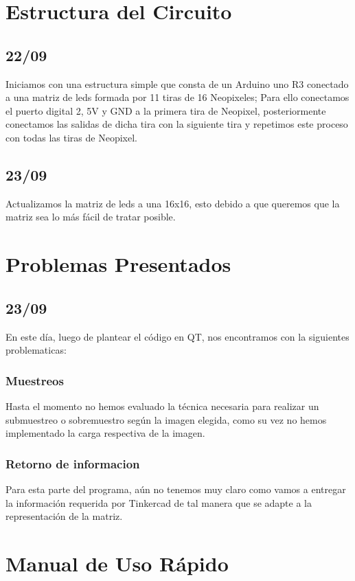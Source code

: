 \documentclass{article}
\begin{document}
    
\section{Estructura del Circuito}
\label{circuito}
    \vspace{0.1cm}

    \begin{flushleft}
        \subsection{22/09}
        Iniciamos con una estructura simple que consta de un Arduino uno R3 conectado a una matriz de leds formada por 11 tiras de 16 Neopixeles; Para ello conectamos el puerto digital 2, 5V y GND a la primera tira de Neopixel, posteriormente conectamos las salidas de dicha tira con la siguiente tira y repetimos este proceso con todas las tiras de Neopixel.
    \end{flushleft}
    
    \begin{flushleft}
        \subsection{23/09}
        Actualizamos la matriz de leds a una 16x16, esto debido a que queremos que la matriz sea lo más fácil de tratar posible.
    \end{flushleft}
\section{Problemas Presentados}
\label{problemas}
    \begin{flushleft}
     \subsection{23/09}
     En este día, luego de plantear el código en QT, nos encontramos con la siguientes problematicas:
    \end{flushleft}
    
    \begin{flushleft}
    \subsubsection{Muestreos}
    Hasta el momento no hemos evaluado la técnica necesaria para realizar un submuestreo o sobremuestro según la imagen elegida, como su vez no hemos implementado la carga respectiva de la imagen.  
    \end{flushleft}
    \begin{flushleft}
    \subsubsection{Retorno de informacion}
    Para esta parte del programa, aún no tenemos muy claro como vamos a entregar la información requerida por Tinkercad de tal manera que se adapte a la representación de la matriz.  
    \end{flushleft}
    
\section{Manual de Uso Rápido}
\label{manual}
    \begin{flushleft}
        
    \end{flushleft}

\vfill

\end{document}
